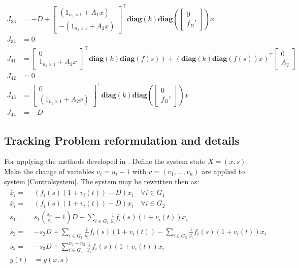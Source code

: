 \documentclass[3p,times]{elsarticle}
\newcommand{\diag}{\textbf{diag}}
\begin{document}
\begin{align}
J_{33} &= -D + \begin{bmatrix} \left(1_{n_1 \times 1} + A_1x\right) \\ -\left(1_{n_2\times 1}+ A_2x\right) \end{bmatrix}^\top \diag(k)\diag\left(
\begin{bmatrix}
0 \\ f_B'
\end{bmatrix}\right)x  \\
J_{34} &= 0 \\
J_{41} &= \begin{bmatrix}0 \\ 1_{n_2 \times 1} + A_2x \end{bmatrix}^\top\diag(k) \diag(f(s)) 
+ (\diag(k)\diag(f(s))x)^\top\begin{bmatrix} 
0 \\ A_2
\end{bmatrix} \\
J_{42} &= 0 \\
J_{43} &= \begin{bmatrix} 0 \\(1_{n_2\times 1} + A_2x) \end{bmatrix}^\top \diag(k) \diag\left(\begin{bmatrix}
0 \\ f_B'
\end{bmatrix}\right) x \\
J_{44} &= -D
\end{align}

\subsection{Tracking Problem reformulation and details}

For applying the methods developed in \cite{Cimen2004}. Define the system state $X = (x,s)$. Make the change of variables $v_i = u_i - 1$ with $v = (v_1,\dots,v_n)$ are applied to system \eqref{Controlsystem}. The system may be rewritten then as:
\begin{align} 
\begin{array}{cl}
\dot{x_i} =& \left(f_i(s)(1+v_i(t)) -D \right)x_i \quad \forall i \in G_1\\
\dot{x_i} =& \left(f_i(s)(1+v_i(t)) -D \right)x_i \quad \forall i \in G_2\\
\dot{s_1} =& \displaystyle s_1\left(\frac{s_{in}}{s_1}-1\right)D-\sum\limits_{i \in G_1}\frac{1}{y_i}f_i(s)(1+v_i(t)) x_i  \\
\dot{s_2} = & \displaystyle -s_2D+\sum\limits_{i \in G_1}\frac{1}{y_i}f_i(s)(1+v_i(t))	-\sum\limits_{i \in G_2}\frac{1}{y_i}f_i(s)(1+v_i(t)) x_i  \\
\dot{s_3} =&  \displaystyle -s_3D+\sum\limits_{i \in G_2}^{n_1+n_2}\frac{1}{y_i}f_i(s)(1+v_i(t)) x_i \\
y(t) & = g(x,s)
\end{array}
\end{align}	
\end{document}
